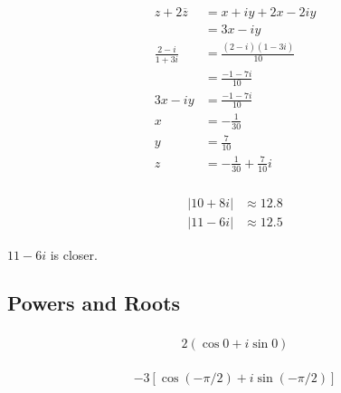 \documentclass{article}
\begin{document}
\setcounter{subsubsection}{36}
\subsubsection{}

\begin{align*}
  z + 2 \overline{z}    & = x + i y + 2 x - 2 i y          \\
                        & = 3 x - i y                      \\
  \frac{2 - i}{1 + 3 i} & = \frac{(2 - i) (1 - 3 i)}{10}   \\
                        & = \frac{-1 - 7 i}{10}            \\
  3 x - i y             & = \frac{-1 - 7 i}{10}            \\
  x                     & = -\frac{1}{30}                  \\
  y                     & = \frac{7}{10}                   \\
  z                     & = -\frac{1}{30} + \frac{7}{10} i
\end{align*}

\setcounter{subsubsection}{38}
\subsubsection{}

\begin{align*}
  |10 + 8 i| & \approx 12.8 \\
  |11 - 6 i| & \approx 12.5
\end{align*}

$11 - 6 i$ is closer.

\subsection{Powers and Roots}

\subsubsection{}

\[2 (\cos 0 + i \sin 0)\]

\setcounter{subsubsection}{2}
\subsubsection{}

\[-3 [\cos (-\pi / 2) + i \sin (-\pi / 2)]\]

\setcounter{subsubsection}{4}
\end{document}
